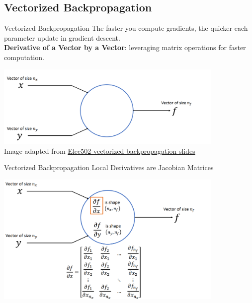 \documentclass[serif, aspectratio=169]{beamer}
\begin{document}
\subsection{Vectorized Backpropagation}
\begin{frame}{Vectorized Backpropagation}
    The faster you compute gradients, the quicker each parameter update in gradient descent.
   \\ \textbf{Derivative of a Vector by a Vector}: leveraging matrix operations for faster computation.
    \begin{center}
        \includegraphics[width=11cm]{pic/vec2.png}  
        \\
{\tiny{Image adapted from} \href{https://people.ece.ubc.ca/bradq/ELEC502Slides/ELEC502-Part5VectorizedBackpropagation.pdf}{\tiny{Elec502 vectorized backpropagation slides}}}
    \end{center}
    
\end{frame}

\begin{frame}{Vectorized Backpropagation}
    Local Derivatives are Jacobian Matrices
    \begin{center}
        \includegraphics[width=11cm]{pic/vec.png}  
    \end{center}
\end{frame}
\end{document}
